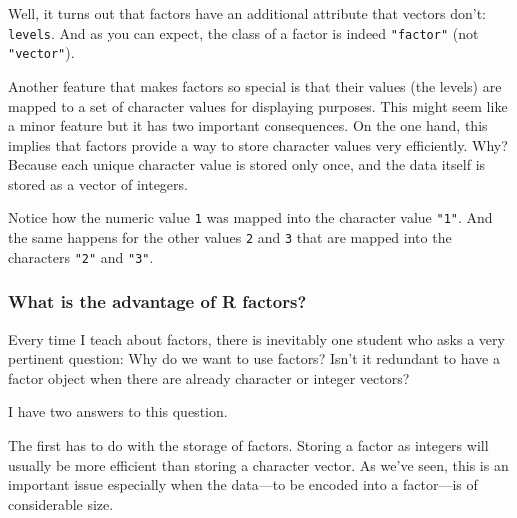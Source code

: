 \documentclass[
]{book}
\newenvironment{Shaded}{\begin{snugshade}}{\end{snugshade}}
\newcommand{\CommentTok}[1]{\textcolor[rgb]{0.56,0.35,0.01}{\textit{#1}}}
\newcommand{\FunctionTok}[1]{\textcolor[rgb]{0.00,0.00,0.00}{#1}}
\newcommand{\NormalTok}[1]{#1}
\begin{document}
Well, it turns out that factors have an additional attribute that vectors don't:
\texttt{levels}. And as you can expect, the class of a factor is indeed \texttt{"factor"}
(not \texttt{"vector"}).

\begin{Shaded}
\end{Shaded}

Another feature that makes factors so special is that their values (the levels)
are mapped to a set of character values for displaying purposes. This might
seem like a minor feature but it has two important consequences. On the one
hand, this implies that factors provide a way to store character values very
efficiently. Why? Because each unique character value is stored only once, and
the data itself is stored as a vector of integers.

Notice how the numeric value \texttt{1} was mapped into the character value \texttt{"1"}. And
the same happens for the other values \texttt{2} and \texttt{3} that are mapped into the
characters \texttt{"2"} and \texttt{"3"}.

\hypertarget{what-is-the-advantage-of-r-factors}{%
\subsubsection*{What is the advantage of R factors?}\label{what-is-the-advantage-of-r-factors}}

Every time I teach about factors, there is inevitably one student who asks a
very pertinent question: Why do we want to use factors? Isn't it redundant to
have a factor object when there are already character or integer vectors?

I have two answers to this question.

The first has to do with the storage of factors. Storing a factor as integers
will usually be more efficient than storing a character vector. As we've seen,
this is an important issue especially when the data---to be encoded into a
factor---is of considerable size.
\end{document}
